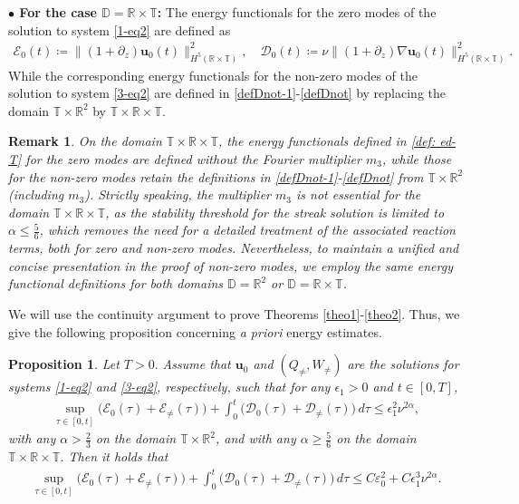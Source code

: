 \documentclass[11pt,reqno]{article}
\newtheorem{prop}[theo]{Proposition}
\newtheorem{rema}[theo]{Remark}
\numberwithin{equation}{section}
\newcommand\R{{\mathbb R}}
\newcommand\T{{\mathbb T}}
\newcommand\DD{{\mathbb D}}
\newcommand\D{{\mathcal D}}
\newcommand\E{{\mathcal E}}
\newcommand\uu{\bm{u}}
\newcommand \tri {\coloneqq}
\let\pa=\partial
\let\var=\varepsilon
\let\f=\frac
\let\ep=\epsilon
\begin{document}
\noindent\textbf{$\bullet$ For the case $\DD=\R\times\T$:} 
The energy functionals for the zero modes of the solution to system \eqref{1-eq2} are defined as
\begin{align}
\label{def: ed-T}
\E_0(t) \tri  \|(1+\pa_z)\uu_0(t)\|_{H^5(\R\times\T)}^2,
\quad
\D_0(t)\tri  \nu \|(1+\pa_z)\nabla \uu_0(t)\|_{H^5(\R\times\T)}^2.
\end{align}
While the corresponding energy functionals for the non-zero modes of the solution to system \eqref{3-eq2} are defined in \eqref{defDnot-1}-\eqref{defDnot} by replacing the domain $\T\times\R^2$ by $\T\times\R\times\T$.
\begin{rema}
    On the domain $\T\times\R\times\T$, the energy functionals defined in \eqref{def: ed-T} for the zero modes are defined without the Fourier multiplier $m_3$, while those for the non-zero modes retain the definitions in \eqref{defDnot-1}-\eqref{defDnot} from $\T\times\R^2$ (including $m_3$). 
    Strictly speaking, the multiplier $m_3$ is not essential for the domain $\T\times\R\times\T$, as the stability threshold for the streak solution is limited to $\alpha\leq \f56$, 
    which removes the need for a detailed treatment of the associated reaction terms, both for zero and non-zero modes.
    Nevertheless, to maintain a unified and concise presentation in the proof of non-zero modes, we employ the same energy functional definitions for both domains $\DD=\R^2$ or $\DD=\R\times\T$.
\end{rema}




We will use the continuity argument to prove Theorems \ref{theo1}-\ref{theo2}.
Thus, we give the following proposition concerning \textit{a priori} energy estimates.
\begin{prop}\label{prop-1}
Let $T>0.$
Assume that $\uu_0$ %
and $(Q_{\not=},W_{\not=})$ 
are the solutions for systems \eqref{1-eq2} and \eqref{3-eq2}, respectively,
such that for any $\ep_1>0$ and $t\in[0,T]$,
\begin{align}\label{priori assumption}
	\sup_{\tau \in[0,t]}\big(\E_0(\tau)+\E_{\not=}(\tau)\big)
	+\int_0^t\big(\D_0(\tau)+\D_{\not=}(\tau)\big)\,d\tau
	\leq \ep_1^2\nu^{2\alpha},
\end{align}
with any $\alpha>\f23$ on the domain $\T\times\R^2$, and with any $\alpha\geq \f56$ on the domain $\T\times\R\times\T$.
Then it holds that
\begin{align}\label{sec3:priori result-1}
	\sup_{\tau\in[0,t]}\big(\E_0(\tau)+\E_{\not=}(\tau)\big)
	+\int_0^t\big(\D_0(\tau)+\D_{\not=}(\tau)\big)\,d\tau
	\leq C\var_0^2+C\ep_1^3\nu^{2\alpha}.
\end{align}
\end{prop}
\end{document}
